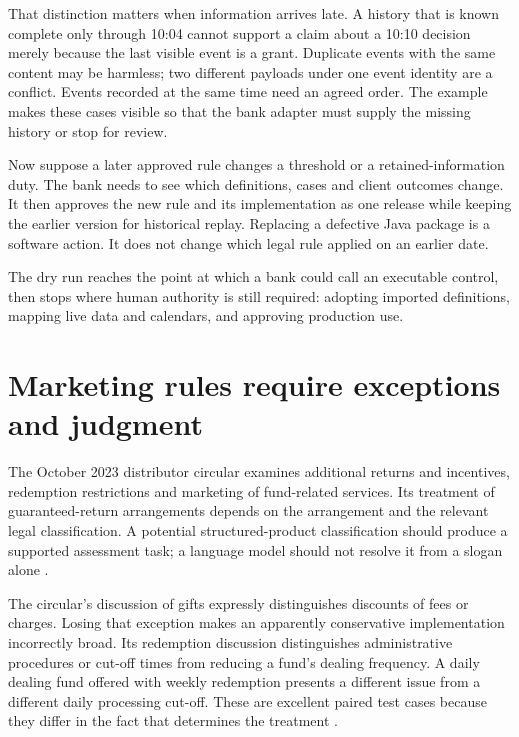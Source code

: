 

That distinction matters when information arrives late. A history that is known
complete only through 10:04 cannot support a claim about a 10:10 decision merely
because the last visible event is a grant. Duplicate events with the same
content may be harmless; two different payloads under one event identity are a
conflict. Events recorded at the same time need an agreed order. The example
makes these cases visible so that the bank adapter must supply the missing
history or stop for review.

Now suppose a later approved rule changes a threshold or a retained-information
duty. The bank needs to see which definitions, cases and client outcomes change.
It then approves the new rule and its implementation as one release while
keeping the earlier version for historical replay. Replacing a defective Java
package is a software action. It does not change which legal rule applied on an
earlier date.

The dry run reaches the point at which a bank could call an executable control,
then stops where human authority is still required: adopting imported
definitions, mapping live data and calendars, and approving production use.

\section{Marketing rules require exceptions and judgment}
\label{merge:P-01-problem:04}


The October 2023 distributor circular examines additional returns and incentives,
redemption restrictions and marketing of fund-related services. Its treatment of
guaranteed-return arrangements depends on the arrangement and the relevant legal
classification. A potential structured-product classification should produce a
supported assessment task; a language model should not resolve it from a slogan
alone \citep[paras.~5--11]{sfcmarketing}.

The circular's discussion of gifts expressly distinguishes discounts of fees or
charges. Losing that exception makes an apparently conservative implementation
incorrectly broad. Its redemption discussion distinguishes administrative
procedures or cut-off times from reducing a fund's dealing frequency. A daily
dealing fund offered with weekly redemption presents a different issue from a
different daily processing cut-off. These are excellent paired test cases because
they differ in the fact that determines the treatment
\citep[paras.~9--14]{sfcmarketing}.

